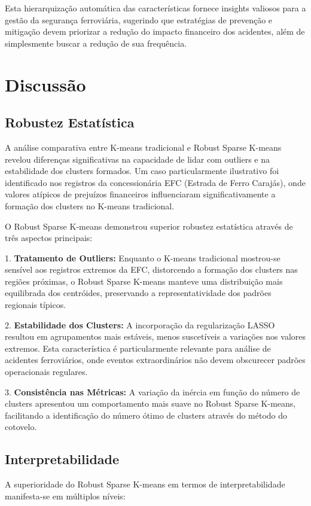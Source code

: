 \documentclass[conference]{IEEEtran}
\begin{document}
Esta hierarquização automática das características fornece insights valiosos para a gestão da segurança ferroviária, sugerindo que estratégias de prevenção e mitigação devem priorizar a redução do impacto financeiro dos acidentes, além de simplesmente buscar a redução de sua frequência.

    
\section{Discussão}

\subsection{Robustez Estatística}
A análise comparativa entre K-means tradicional e Robust Sparse K-means revelou diferenças significativas na capacidade de lidar com outliers e na estabilidade dos clusters formados. Um caso particularmente ilustrativo foi identificado nos registros da concessionária EFC (Estrada de Ferro Carajás), onde valores atípicos de prejuízos financeiros influenciaram significativamente a formação dos clusters no K-means tradicional.

O Robust Sparse K-means demonstrou superior robustez estatística através de três aspectos principais:

1. \textbf{Tratamento de Outliers:} Enquanto o K-means tradicional mostrou-se sensível aos registros extremos da EFC, distorcendo a formação dos clusters nas regiões próximas, o Robust Sparse K-means manteve uma distribuição mais equilibrada dos centróides, preservando a representatividade dos padrões regionais típicos.

2. \textbf{Estabilidade dos Clusters:} A incorporação da regularização LASSO resultou em agrupamentos mais estáveis, menos suscetíveis a variações nos valores extremos. Esta característica é particularmente relevante para análise de acidentes ferroviários, onde eventos extraordinários não devem obscurecer padrões operacionais regulares.

3. \textbf{Consistência nas Métricas:} A variação da inércia em função do número de clusters apresentou um comportamento mais suave no Robust Sparse K-means, facilitando a identificação do número ótimo de clusters através do método do cotovelo.

\subsection{Interpretabilidade}
A superioridade do Robust Sparse K-means em termos de interpretabilidade manifesta-se em múltiplos níveis:
\end{document}
